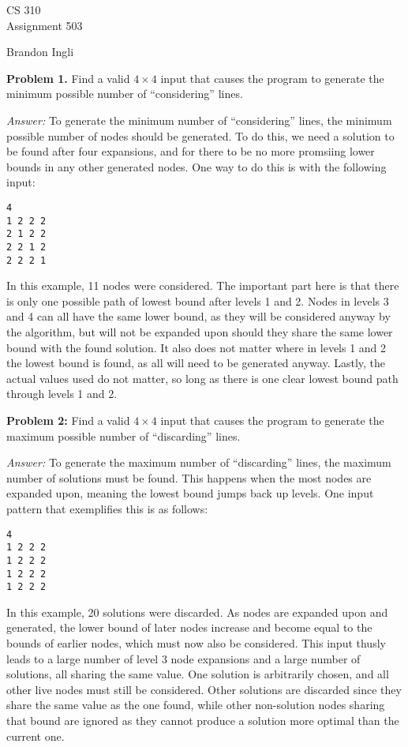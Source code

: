 \documentclass[11pt]{article}
\begin{document}
\thispagestyle{empty}

\begin{center}
{\large CS 310}\\
Assignment 503
\end{center}

\begin{flushright}
Brandon Ingli
\end{flushright}

\textbf{Problem 1.} Find a valid $4 \times 4$ input that causes the program to 
generate the minimum possible number of ``considering'' lines.

\textit{Answer:} To generate the minimum number of ``considering'' lines, 
the minimum possible number of nodes should be generated. To do this, we 
need a solution to be found after four expansions, and for there to be no 
more promsiing lower bounds in any other generated nodes. One way to do this 
is with the following input:
\begin{Verbatim}[xleftmargin=5mm]
4
1 2 2 2
2 1 2 2
2 2 1 2
2 2 2 1
\end{Verbatim}
In this example, 11 nodes were considered.
The important part here is that there is only one possible path of lowest 
bound after levels 1 and 2. Nodes in levels 3 and 4 can all have the same 
lower bound, as they will be considered anyway by the algorithm, but will 
not be expanded upon should they share the same lower bound with the found 
solution. It also does not matter where in levels 1 and 2 the lowest bound 
is found, as all will need to be generated anyway. Lastly, the actual values 
used do not matter, so long as there is one clear lowest bound path through 
levels 1 and 2.

\textbf{Problem 2:} Find a valid $4 \times 4$ input that causes the program to 
generate the maximum possible number of ``discarding'' lines.

\textit{Answer:} To generate the maximum number of ``discarding'' lines, 
the maximum number of solutions must be found. This happens when the most 
nodes are expanded upon, meaning the lowest bound jumps back up levels. One 
input pattern that exemplifies this is as follows:
\begin{Verbatim}[xleftmargin=5mm]
4
1 2 2 2
1 2 2 2
1 2 2 2
1 2 2 2
\end{Verbatim}
In this example, 20 solutions were discarded. 
As nodes are expanded upon and generated, the lower bound of later nodes 
increase and become equal to the bounds of earlier nodes, which must now 
also be considered. This input thusly leads to a large number of level 3 
node expansions and a large number of solutions, all sharing the 
same value. One solution is arbitrarily chosen, and all other live nodes must 
still be considered. Other solutions are discarded since they share the same 
value as the one found, while other non-solution nodes sharing that bound are 
ignored as they cannot produce a solution more optimal than the current one.
\end{document}
